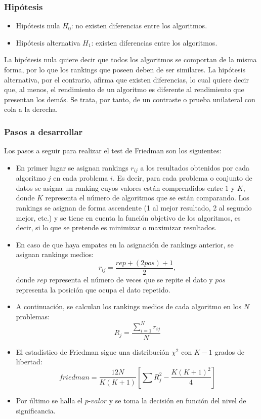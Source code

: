 \subsubsection{Hipótesis}
\begin{itemize}
\item Hipótesis nula $H_0$: no existen diferencias entre los algoritmos.
\item Hipótesis alternativa $H_1$: existen diferencias entre los algoritmos.
\end{itemize}
La hipótesis nula quiere decir que todos los algoritmos se comportan de la misma forma, por lo que los rankings
que poseen deben de ser similares. La hipótesis alternativa, por el contrario, afirma que existen diferencias,
lo cual quiere decir que, al menos, el rendimiento de un algoritmo es diferente al rendimiento que presentan los
demás. Se trata, por tanto, de un contraste o prueba unilateral con cola a la derecha.

\subsubsection{Pasos a desarrollar}
Los pasos a seguir para realizar el test de Friedman son los siguientes:
\begin{itemize}
\item En primer lugar se asignan rankings $r_{ij}$ a los resultados obtenidos por cada algoritmo $j$ en cada
problema $i$. Es decir, para cada problema o conjunto de datos se asigna un ranking cuyos valores están
comprendidos entre $1$ y $K$, donde $K$ representa el número de algoritmos que se están comparando. Los rankings
se asignan de forma ascendente (1 al mejor resultado, 2 al segundo mejor, etc.) y se tiene en cuenta la función
objetivo de los algoritmos, es decir, si lo que se pretende es minimizar o maximizar resultados.
\item En caso de que haya empates en la asignación de rankings anterior, se asignan rankings medios:
\[ r_{ij} = \frac{rep + (2pos) + 1}{2}, \]
donde $rep$ representa el número de veces que se repite el dato y $pos$ representa la posición que ocupa
el dato repetido.
\item A continuación, se calculan los rankings medios de cada algoritmo en los $N$ problemas:
\[ R_j = \frac{\sum_{i=1}^{N} r_{ij}}{N} \]
\item El estadístico de Friedman sigue una distribución $\chi^2$ con $K-1$ grados de
libertad:
\[ friedman = \frac{12N}{K(K+1)} \left[\sum R_j^2 - \frac{K(K+1)^2}{4} \right] \]
\item Por último se halla el $\textit{p-valor}$ y se toma la decisión en función del nivel de significancia.
\end{itemize}


